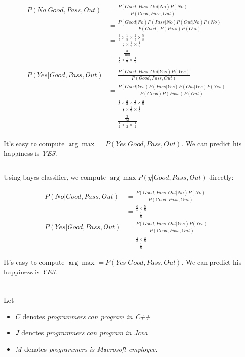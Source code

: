 \documentclass[12pt, letterpaper]{article}
\begin{document}
\begin{align*}
P(No|Good, Pass, Out)
&=\frac{P(Good, Pass, Out|No){P(No)}}{P(Good, Pass, Out)}\\
&=\frac{P(Good|No) P(Pass|No) P(Out|No){P(No)}}{P(Good) P(Pass) P(Out)}\\
&=\frac{\frac{3}{5}\times\frac{1}{5}\times\frac{2}{5}\times\frac{5}{8}}{\frac{1}{2}\times\frac{1}{2}\times\frac{1}{2}}\\
&=\frac{\frac{3}{100}}{\frac{1}{2}\times\frac{1}{2}\times\frac{1}{2}}\\\\
P(Yes|Good, Pass, Out)
&=\frac{P(Good, Pass, Out|Yes){P(Yes)}}{P(Good, Pass, Out)}\\
&=\frac{P(Good|Yes) P(Pass|Yes) P(Out|Yes){P(Yes)}}{P(Good) P(Pass) P(Out)}\\
&=\frac{\frac{1}{3}\times\frac{3}{3}\times\frac{1}{3}\times\frac{3}{8}}{\frac{1}{2}\times\frac{1}{2}\times\frac{1}{2}}\\
&=\frac{\frac{3}{72}}{\frac{1}{2}\times\frac{1}{2}\times\frac{1}{2}}\\
\end{align*}

It's easy to compute $\arg\max = P(Yes|Good, Pass, Out)$. We can predict his happiness is \emph{YES}.

\subsection{}

Using bayes classifier, we compute $\arg\max P(y|Good, Pass, Out)$ directly:

\begin{align*}
P(No|Good, Pass, Out)
&=\frac{P(Good, Pass, Out|No){P(No)}}{P(Good, Pass, Out)}\\
&=\frac{\frac{0}{5}\times\frac{5}{8}}{\frac{1}{8}}\\
P(Yes|Good, Pass, Out)
&=\frac{P(Good, Pass, Out|Yes){P(Yes)}}{P(Good, Pass, Out)}\\
&=\frac{\frac{1}{3}\times\frac{3}{8}}{\frac{1}{8}}
\end{align*}

It's easy to compute $\arg\max = P(Yes|Good, Pass, Out)$. We can predict his happiness is \emph{YES}.

\section{}

Let 
\begin{itemize}
\item $C$ denotes \emph{programmers can program in C++}
\item $J$ denotes \emph{programmers can program in Java}
\item $M$ denotes \emph{programmers is Macrosoft employee}.
\end{itemize}
\end{document}
